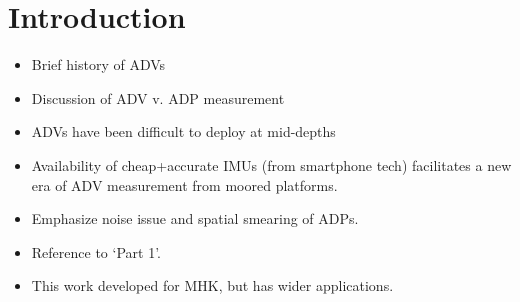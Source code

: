 
\section{Introduction}

\begin{itemize}
\item Brief history of ADVs
\item Discussion of ADV v. ADP measurement
\item ADVs have been difficult to deploy at mid-depths
\item Availability of cheap+accurate IMUs (from smartphone tech) facilitates a new era of ADV measurement from moored platforms.
\item Emphasize noise issue and spatial smearing of ADPs.
\item Reference to `Part 1'.
\item This work developed for MHK, but has wider applications.
\end{itemize}



